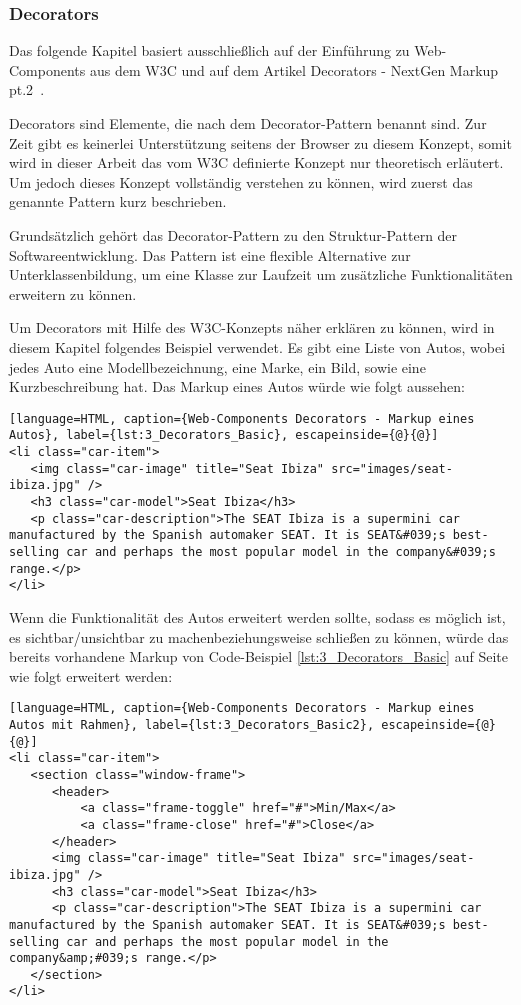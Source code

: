 \subsubsection{Decorators}
\label{sec:3_WC_Decorators}

Das folgende Kapitel basiert ausschließlich auf der Einführung zu Web-Components aus dem W3C \citereset \autocite[siehe][]{CooneyGlazkov.2013} und auf dem Artikel \glqq Decorators - NextGen Markup pt.2\grqq\ \citereset \autocite[siehe][]{PreventDefault.2013}.

Decorators sind Elemente, die nach dem Decorator-Pattern benannt sind. Zur Zeit gibt es keinerlei Unterstützung seitens der Browser zu diesem Konzept, somit wird in dieser Arbeit das vom W3C definierte Konzept nur theoretisch erläutert. Um jedoch dieses Konzept vollständig verstehen zu können, wird zuerst das genannte Pattern kurz beschrieben.

Grundsätzlich gehört das Decorator-Pattern zu den Struktur-Pattern der Softwareentwicklung. Das Pattern ist eine flexible Alternative zur Unterklassenbildung, um eine Klasse zur Laufzeit um zusätzliche Funktionalitäten erweitern zu können.

Um Decorators mit Hilfe des W3C-Konzepts näher erklären zu können, wird in diesem Kapitel folgendes Beispiel verwendet. Es gibt eine Liste von Autos, wobei jedes Auto
eine Modellbezeichnung, eine Marke, ein Bild, sowie eine Kurzbeschreibung hat. Das Markup eines Autos würde wie folgt aussehen:

\begin{lstlisting}[language=HTML, caption={Web-Components Decorators - Markup eines Autos}, label={lst:3_Decorators_Basic}, escapeinside={@}{@}]
<li class="car-item">
   <img class="car-image" title="Seat Ibiza" src="images/seat-ibiza.jpg" />
   <h3 class="car-model">Seat Ibiza</h3>
   <p class="car-description">The SEAT Ibiza is a supermini car manufactured by the Spanish automaker SEAT. It is SEAT&#039;s best-selling car and perhaps the most popular model in the company&#039;s range.</p>
</li>
\end{lstlisting}


Wenn die Funktionalität des Autos erweitert werden sollte, sodass es möglich ist, es sichtbar/unsichtbar zu machenbeziehungsweise schließen zu können, würde das bereits vorhandene Markup von Code-Beispiel \ref{lst:3_Decorators_Basic} auf Seite \pageref{lst:3_Decorators_Basic} wie folgt erweitert werden:

\begin{lstlisting}[language=HTML, caption={Web-Components Decorators - Markup eines Autos mit Rahmen}, label={lst:3_Decorators_Basic2}, escapeinside={@}{@}]
<li class="car-item">
   <section class="window-frame">
      <header>
          <a class="frame-toggle" href="#">Min/Max</a>
          <a class="frame-close" href="#">Close</a>
      </header>
      <img class="car-image" title="Seat Ibiza" src="images/seat-ibiza.jpg" />
      <h3 class="car-model">Seat Ibiza</h3>
      <p class="car-description">The SEAT Ibiza is a supermini car manufactured by the Spanish automaker SEAT. It is SEAT&#039;s best-selling car and perhaps the most popular model in the company&amp;#039;s range.</p>
   </section>
</li>
\end{lstlisting}

